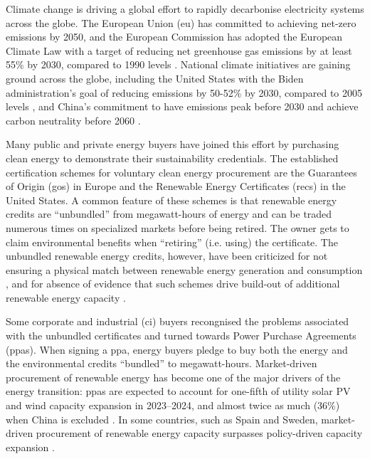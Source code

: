 

Climate change is driving a global effort to rapidly decarbonise electricity systems across the globe. 
The European Union (\gls{eu}) has committed to achieving net-zero emissions by 2050, and the European Commission has adopted the European Climate Law with a target of reducing net greenhouse gas emissions by at least 55\% by 2030, compared to 1990 levels \cite{EuropeanClimateLaw2020}. 
National climate initiatives are gaining ground across the globe, including the United States with the Biden administration's goal of reducing emissions by 50-52\% by 2030, compared to 2005 levels \cite{BidenClimatePlan2021}, and China's commitment to have \co emissions peak before 2030 and achieve carbon neutrality before 2060 \cite{ChinaNetZero-IEA}.


Many public and private energy buyers have joined this effort by purchasing clean energy to demonstrate their sustainability credentials. 
The established certification schemes for voluntary clean energy procurement are the Guarantees of Origin (\gls{go}s) in Europe and the Renewable Energy Certificates (\gls{rec}s) in the United States.
A common feature of these schemes is that renewable energy credits are \enquote{unbundled} from megawatt-hours of energy and can be traded numerous times on specialized markets before being retired.
The owner gets to claim environmental benefits when \enquote{retiring} (i.e. using) the certificate.
The unbundled renewable energy credits, however, have been criticized for not ensuring a physical match between renewable energy generation and consumption \cite{spglobal-recs, bock-icelandGOproblem, re100report-2020}, and for absence of evidence that such schemes drive build-out of additional renewable energy capacity \cite{bjorn-RECSnatcom-2022, gillenwater-2014}.

Some corporate and industrial (\gls{ci}) buyers recongnised the problems associated with the unbundled certificates and turned towards Power Purchase Agreements (\gls{ppa}s). 
When signing a \gls{ppa}, energy buyers pledge to buy both the energy and the environmental credits \enquote{bundled} to megawatt-hours.
Market-driven procurement of renewable energy has become one of the major drivers of the energy transition: \gls{ppa}s are expected to account for one-fifth of utility solar PV and wind capacity expansion in 2023--2024, and almost twice as much (36\%) when China is excluded \cite{iea-REppa2023}.
In some countries, such as Spain and Sweden, market-driven procurement of renewable energy capacity surpasses policy-driven capacity expansion \cite{iea-REppa2023}.

